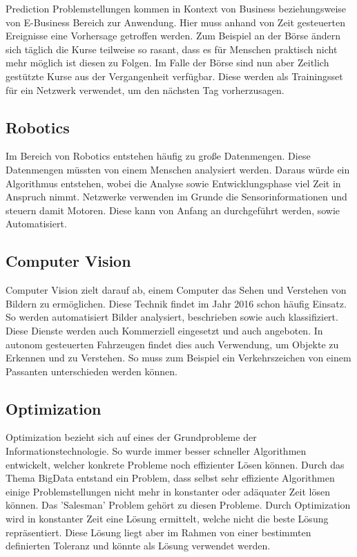 Prediction Problemstellungen kommen in Kontext von Business beziehungsweise von E-Business Bereich zur Anwendung. 
Hier muss anhand von Zeit gesteuerten Ereignisse eine Vorhersage getroffen werden. 
Zum Beispiel an der Börse ändern sich täglich die Kurse teilweise so rasant, dass es für Menschen praktisch nicht mehr möglich ist diesen zu Folgen. 
Im Falle der Börse sind nun aber Zeitlich gestützte Kurse aus der Vergangenheit verfügbar. 
Diese werden als Trainingsset für ein Netzwerk verwendet, um den nächsten Tag vorherzusagen. 

\subsection{Robotics}
\label{subsec:Robotics}

Im Bereich von Robotics entstehen häufig zu große Datenmengen. 
Diese Datenmengen müssten von einem Menschen analysiert werden. 
Daraus würde ein Algorithmus entstehen, wobei die Analyse sowie Entwicklungsphase viel Zeit in Anspruch nimmt. 
Netzwerke verwenden im Grunde die Sensorinformationen und steuern damit Motoren. 
Diese kann von Anfang an durchgeführt werden, sowie Automatisiert.

\subsection{Computer Vision}
\label{subsec:Cumputer Vision}

Computer Vision zielt darauf ab, einem Computer das Sehen und Verstehen von Bildern zu ermöglichen. 
Diese Technik findet im Jahr 2016 schon häufig Einsatz. 
So werden automatisiert Bilder analysiert, beschrieben sowie auch klassifiziert. 
Diese Dienste werden auch Kommerziell eingesetzt und auch angeboten. 
In autonom gesteuerten Fahrzeugen findet dies auch Verwendung, um Objekte zu Erkennen und zu Verstehen. 
So muss zum Beispiel ein Verkehrszeichen von einem Passanten unterschieden werden können.

\subsection{Optimization}
\label{subsec:Optimization}

Optimization bezieht sich auf eines der Grundprobleme der Informationstechnologie. 
So wurde immer besser schneller Algorithmen entwickelt, welcher konkrete Probleme noch effizienter Lösen können. 
Durch das Thema BigData entstand ein Problem, dass selbst sehr effiziente Algorithmen einige Problemstellungen nicht mehr in konstanter oder adäquater Zeit lösen können. 
Das 'Salesman' Problem gehört zu diesen Probleme. 
Durch Optimization wird in konstanter Zeit eine Lösung ermittelt, welche nicht die beste Lösung repräsentiert. 
Diese Lösung liegt aber im Rahmen von einer bestimmten definierten Toleranz und könnte als Lösung verwendet werden.

